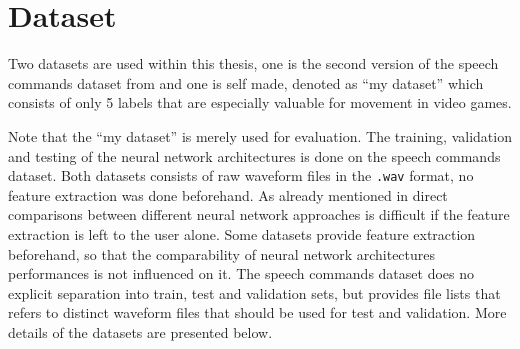 
\section{Dataset}\label{sec:exp_dataset}
Two datasets are used within this thesis, one is the second version of the speech commands dataset from \cite{Warden2018} and one is self made, denoted as \enquote{my dataset} which consists of only 5 labels that are especially valuable for movement in video games.


Note that the \enquote{my dataset} is merely used for evaluation.
The training, validation and testing of the neural network architectures is done on the speech commands dataset.
Both datasets consists of raw waveform files in the \texttt{.wav} format, no feature extraction was done beforehand.
As already mentioned in  direct comparisons between different neural network approaches is difficult if the feature extraction is left to the user alone.
Some datasets provide feature extraction beforehand, so that the comparability of neural network architectures performances is not influenced on it.
The speech commands dataset does no explicit separation into train, test and validation sets, but provides file lists that refers to distinct waveform files that should be used for test and validation.
More details of the datasets are presented below.




% 


